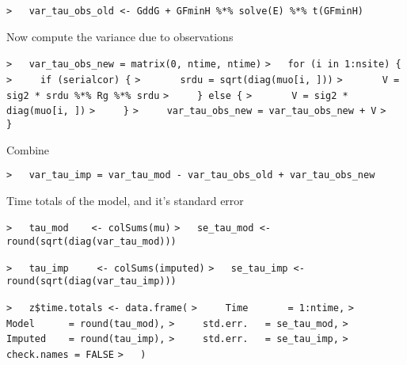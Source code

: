 \documentclass[a4paper]{article}
\begin{document}
\verb~>   var_tau_obs_old <- GddG + GFminH %*% solve(E) %*% t(GFminH)~\par

Now compute the variance due to observations\par
\verb~>   var_tau_obs_new = matrix(0, ntime, ntime)~\newline
\verb~>   for (i in 1:nsite) {~\newline
\verb~>     if (serialcor) {~\newline
\verb~>       srdu = sqrt(diag(muo[i, ]))~\newline
\verb~>       V = sig2 * srdu %*% Rg %*% srdu~\newline
\verb~>     } else {~\newline
\verb~>       V = sig2 * diag(muo[i, ])~\newline
\verb~>     }~\newline
\verb~>     var_tau_obs_new = var_tau_obs_new + V~\newline
\verb~>   }~\par

Combine\par
\verb~>   var_tau_imp = var_tau_mod - var_tau_obs_old + var_tau_obs_new~\par

Time totals of the model, and it's standard error\par
\verb~>   tau_mod    <- colSums(mu)~\newline
\verb~>   se_tau_mod <- round(sqrt(diag(var_tau_mod)))~\par

\verb~>   tau_imp     <- colSums(imputed)~\newline
\verb~>   se_tau_imp <- round(sqrt(diag(var_tau_imp)))~\par

\verb~>   z$time.totals <- data.frame(~\newline
\verb~>     Time       = 1:ntime,~\newline
\verb~>     Model      = round(tau_mod),~\newline
\verb~>     std.err.   = se_tau_mod,~\newline
\verb~>     Imputed    = round(tau_imp),~\newline
\verb~>     std.err.   = se_tau_imp,~\newline
\verb~>     check.names = FALSE~\newline
\verb~>   )~\par
\end{document}
